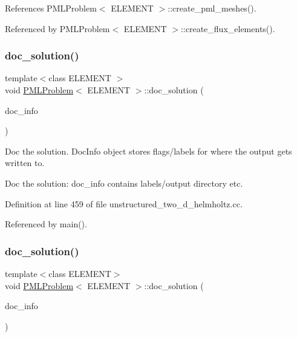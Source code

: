 References P\+M\+L\+Problem$<$ E\+L\+E\+M\+E\+N\+T $>$\+::create\+\_\+pml\+\_\+meshes().



Referenced by P\+M\+L\+Problem$<$ E\+L\+E\+M\+E\+N\+T $>$\+::create\+\_\+flux\+\_\+elements().

\mbox{\label{classPMLProblem_ae04985b020a9e0526ab829ca316adb26}} 
\subsubsection{\texorpdfstring{doc\+\_\+solution()}{doc\_solution()}\hspace{0.1cm}{\footnotesize\ttfamily [1/2]}}
{\footnotesize\ttfamily template$<$class E\+L\+E\+M\+E\+NT $>$ \\
void \hyperlink{classPMLProblem}{P\+M\+L\+Problem}$<$ E\+L\+E\+M\+E\+NT $>$\+::doc\+\_\+solution (\begin{DoxyParamCaption}\item[{Doc\+Info \&}]{doc\+\_\+info }\end{DoxyParamCaption})}



Doc the solution. Doc\+Info object stores flags/labels for where the output gets written to. 

Doc the solution\+: doc\+\_\+info contains labels/output directory etc. 

Definition at line 459 of file unstructured\+\_\+two\+\_\+d\+\_\+helmholtz.\+cc.



Referenced by main().

\mbox{\label{classPMLProblem_ae04985b020a9e0526ab829ca316adb26}} 
\subsubsection{\texorpdfstring{doc\+\_\+solution()}{doc\_solution()}\hspace{0.1cm}{\footnotesize\ttfamily [2/2]}}
{\footnotesize\ttfamily template$<$class E\+L\+E\+M\+E\+NT$>$ \\
void \hyperlink{classPMLProblem}{P\+M\+L\+Problem}$<$ E\+L\+E\+M\+E\+NT $>$\+::doc\+\_\+solution (\begin{DoxyParamCaption}\item[{Doc\+Info \&}]{doc\+\_\+info }\end{DoxyParamCaption})}



